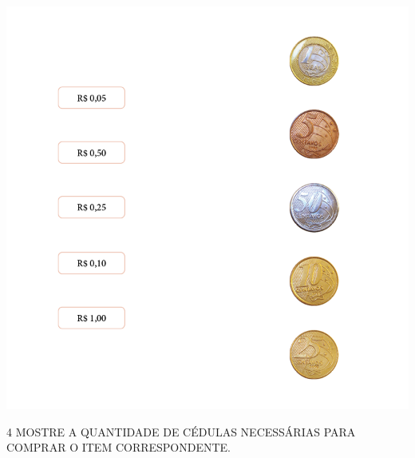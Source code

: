 \begin{minipage}{.8\textwidth}
\centering
\includegraphics[width=\textwidth]{./media/SAEB_1ANO_MAT_FIGURA70.png}
\end{minipage}
\begin{minipage}{.2\textwidth}
\end{minipage}

\pagebreak
\num{4} MOSTRE A QUANTIDADE DE CÉDULAS NECESSÁRIAS PARA COMPRAR O ITEM CORRESPONDENTE.


